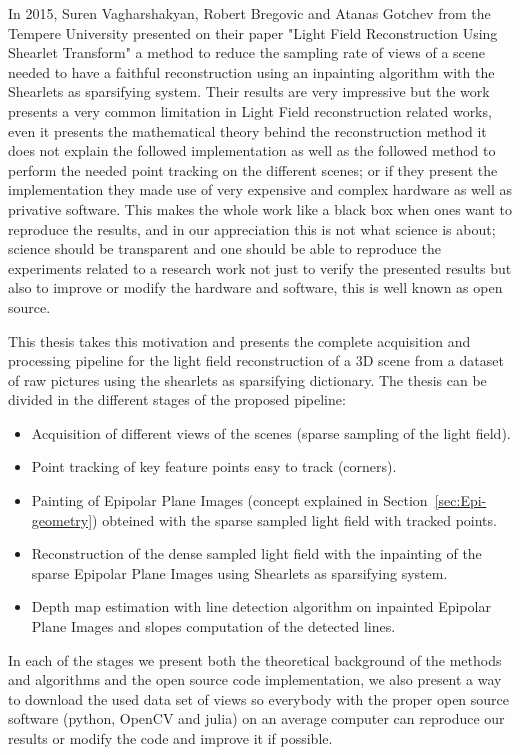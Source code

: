 In 2015, Suren Vagharshakyan, Robert Bregovic and Atanas Gotchev from the Tempere University presented on their paper "Light Field Reconstruction Using Shearlet Transform"\cite{LF-Shearlets} a method to reduce the sampling rate of views of a scene needed to have a faithful reconstruction using an inpainting algorithm with the Shearlets as sparsifying system. Their results are very impressive but the work presents a very common limitation in Light Field reconstruction related works, even it presents the mathematical theory behind the reconstruction method it does not explain the followed implementation as well as the followed method to perform the needed point tracking on the different scenes; or if they present the implementation they made use of very expensive and complex hardware as well as privative software. This makes the whole work like a black box when ones want to reproduce the results, and in our appreciation this is not what science is about; science should be transparent and one should be able to reproduce the experiments related to a research work not just to verify the presented results but also to improve or modify the hardware and software, this is well known as open source. 

\bigskip

This thesis takes this motivation and presents the complete acquisition and processing pipeline for the light field reconstruction of a 3D scene from a dataset of raw pictures using the shearlets as sparsifying dictionary. The thesis can be divided in the different stages of the proposed pipeline:

\begin{itemize}
\item Acquisition of different views of the scenes (sparse sampling of the light field).
\item Point tracking of key feature points easy to track (corners).
\item Painting of Epipolar Plane Images (concept explained in Section~\ref{sec:Epi-geometry}) obteined with the sparse sampled light field with tracked points.
\item Reconstruction of the dense sampled light field with the inpainting of the sparse Epipolar Plane Images using Shearlets as sparsifying system. 
\item Depth map estimation with line detection algorithm on inpainted Epipolar Plane Images and slopes computation of the detected lines.
\end{itemize}

In each of the stages we present both the theoretical background of the methods and algorithms and the open source code implementation, we also present a way to download the used data set of views so everybody with the proper open source software (python, OpenCV and julia) on an average computer can reproduce our results or modify the code and improve it if possible.

